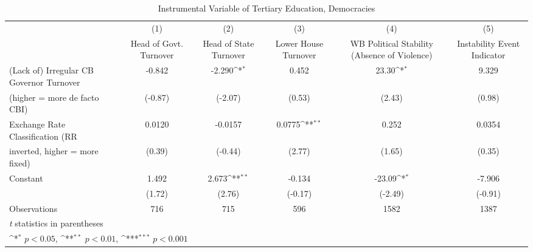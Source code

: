 \begin{table}[htbp]\centering
\def\sym#1{\ifmmode^{#1}\else\(^{#1}\)\fi}
\caption{Instrumental Variable of Tertiary Education, Democracies \label{demIfivs2}}
\begin{tabular}{l*{5}{c}}
\toprule
                                        &\multicolumn{1}{c}{(1)}&\multicolumn{1}{c}{(2)}&\multicolumn{1}{c}{(3)}&\multicolumn{1}{c}{(4)}&\multicolumn{1}{c}{(5)}\\
                                        &\multicolumn{1}{c}{Head of Govt. Turnover}&\multicolumn{1}{c}{Head of State Turnover}&\multicolumn{1}{c}{Lower House Turnover}&\multicolumn{1}{c}{WB Political Stability (Absence of Violence)}&\multicolumn{1}{c}{Instability Event Indicator}\\
\midrule
(Lack of) Irregular CB Governor Turnover&   -0.842         &   -2.290\sym{*}  &    0.452         &    23.30\sym{*}  &    9.329         \\
(higher = more de facto CBI)            &  (-0.87)         &  (-2.07)         &   (0.53)         &   (2.43)         &   (0.98)         \\
\addlinespace
Exchange Rate Classification (RR        &   0.0120         &  -0.0157         &   0.0775\sym{**} &    0.252         &   0.0354         \\
inverted, higher = more fixed)          &   (0.39)         &  (-0.44)         &   (2.77)         &   (1.65)         &   (0.35)         \\
\addlinespace
Constant                                &    1.492         &    2.673\sym{**} &   -0.134         &   -23.09\sym{*}  &   -7.906         \\
                                        &   (1.72)         &   (2.76)         &  (-0.17)         &  (-2.49)         &  (-0.91)         \\
\midrule
Observations                            &      716         &      715         &      596         &     1582         &     1387         \\
\bottomrule
\multicolumn{6}{l}{\footnotesize \textit{t} statistics in parentheses}\\
\multicolumn{6}{l}{\footnotesize \sym{*} \(p<0.05\), \sym{**} \(p<0.01\), \sym{***} \(p<0.001\)}\\
\end{tabular}
\end{table}
